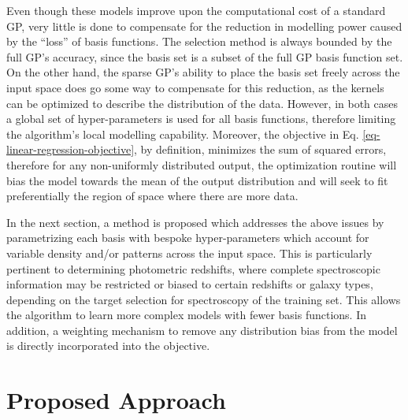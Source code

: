 \documentclass[useAMS,usenatbib,fleqn]{mn2e}
\begin{document}
Even though these models improve upon the computational cost of a standard GP, very little is done to compensate for the reduction in modelling power caused by the ``loss'' of basis functions. The selection method is always bounded by the full GP's accuracy, since the basis set is a subset of the full GP basis function set. On the other hand, the sparse GP's ability to place the basis set freely across the input space does go some way to compensate for this reduction, as the kernels can be optimized to describe the distribution of the data. However, in both cases a global set of hyper-parameters is used for all basis functions, therefore limiting the algorithm's local modelling capability. Moreover, the objective in Eq. \eqref{eq-linear-regression-objective}, by definition, minimizes the sum of squared errors, therefore for any non-uniformly distributed output, the optimization routine will bias the model towards the mean of the output distribution and will seek to fit preferentially the region of space where there are more data.

In the next section, a method is proposed which addresses the above issues by parametrizing each basis with bespoke hyper-parameters which account for variable density and/or patterns across the input space. This is particularly pertinent to determining photometric redshifts, where complete spectroscopic information may be restricted or biased to certain redshifts or galaxy types, depending on the target selection for spectroscopy of the training set.
This allows the algorithm to learn more complex models with fewer basis functions. In addition, a weighting mechanism to remove any distribution bias from the model is directly incorporated into the objective.

\section{Proposed Approach}
\label{sec-proposed-approach}
\end{document}
